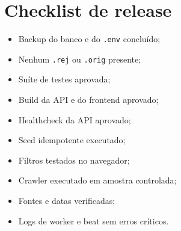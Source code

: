 \chapter{Checklist de release}

\begin{itemize}[leftmargin=*,itemsep=0.25em]
\item Backup do banco e do \texttt{.env} concluído;
\item Nenhum \texttt{.rej} ou \texttt{.orig} presente;
\item Suíte de testes aprovada;
\item Build da API e do frontend aprovado;
\item Healthcheck da API aprovado;
\item Seed idempotente executado;
\item Filtros testados no navegador;
\item Crawler executado em amostra controlada;
\item Fontes e datas verificadas;
\item Logs de worker e beat sem erros críticos.
\end{itemize}
